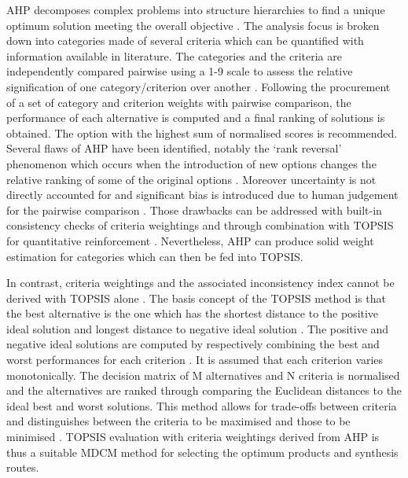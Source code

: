 AHP decomposes complex problems into structure hierarchies to find a unique optimum solution meeting the overall objective \cite{mu_practical_2017}. The analysis focus is broken down into categories made of several criteria which can be quantified with information available in literature. The categories and the criteria are independently compared pairwise using a 1-9 scale to assess the relative signification of one category/criterion over another \cite{saaty_analytic_1987}. Following the procurement of a set of category and criterion weights with pairwise comparison, the performance of each alternative is computed and a final ranking of solutions is obtained. The option with the highest sum of normalised scores is recommended. Several flaws of AHP have been identified, notably the ‘rank reversal’ phenomenon which occurs when the introduction of new options changes the relative ranking of some of the original options \cite{great_britain_multi-criteria_2009}. Moreover uncertainty is not directly accounted for and significant bias is introduced due to human judgement for the pairwise comparison \cite{millet_modelling_2002}. Those drawbacks can be addressed with built-in consistency checks of criteria weightings and through combination with TOPSIS for quantitative reinforcement \cite{tzeng_multi-criteria_2005}. Nevertheless, AHP can produce solid weight estimation for categories which can then be fed into TOPSIS. 

In contrast, criteria weightings and the associated inconsistency index cannot be derived with TOPSIS alone \cite{roszkowska_multi-criteria_2011}. The basis concept of the TOPSIS method is that the best alternative is the one which has the shortest distance to the positive ideal solution and longest distance to negative ideal solution \cite{pohekar_application_2004}. The positive and negative ideal solutions are computed by respectively combining the best and worst performances for each criterion \cite{olson_comparison_2004}. It is assumed that each criterion varies monotonically. The decision matrix of M alternatives and N criteria is normalised and the alternatives are ranked through comparing the Euclidean distances to the ideal best and worst solutions. This method allows for trade-offs between criteria and distinguishes between the criteria to be maximised and those to be minimised \cite{pirdashti_multi-criteria_2009}. TOPSIS evaluation with criteria weightings derived from AHP is thus a suitable MDCM method for selecting the optimum products and synthesis routes.


